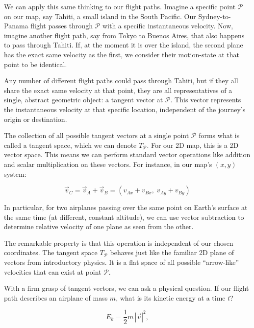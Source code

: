 \documentclass[twocolumn]{article}
\begin{document}
We can apply this same thinking to our flight paths. Imagine a specific
point \(\mathcal{P}\) on our map, say Tahiti, a small island in the South Pacific.
Our Sydney-to-Panama flight passes through \(\mathcal{P}\) with a specific
instantaneous velocity. Now, imagine another flight path, say from Tokyo
to Buenos Aires, that also happens to pass through Tahiti. If, at the
moment it is over the island, the second plane has the exact same
velocity as the first, we consider their motion-state at that point to be
identical.

Any number of different flight paths could pass through Tahiti,
but if they all share the exact same velocity at that point, they are
all representatives of a single, abstract geometric object: a tangent
vector at \(\mathcal{P}\). This vector represents the instantaneous velocity at
that specific location, independent of the journey's origin or
destination.

The collection of all possible tangent vectors at a single point \(\mathcal{P}\)
forms what is called a tangent space, which we can denote \(T_\mathcal{P}\). For
our 2D map, this is a 2D vector space. This means we can perform
standard vector operations like addition and scalar multiplication on
these vectors. For instance, in our map's \((x, y)\) system:

\begin{equation}
\vec{v}_C = \vec{v}_A + \vec{v}_B = (v_{Ax} + v_{Bx},\; v_{Ay} + v_{By})
\end{equation}

In particular, for two airplanes passing over the same point on
Earth's surface at the same time (at different, constant altitude), we
can use vector subtraction to determine relative velocity of one plane
as seen from the other.

The remarkable property is that this operation is independent of our
chosen coordinates. The tangent space \(T_\mathcal{P}\) behaves just like the
familiar 2D plane of vectors from introductory physics. It is a flat
space of all possible ``arrow-like'' velocities that can exist at
point \(\mathcal{P}\).

With a firm grasp of tangent vectors, we can ask a physical question. If
our flight path describes an airplane of mass \(m\), what is its kinetic
energy at a time \(t\)?

\begin{equation}
E_k = \frac{1}{2} m \, |\vec{v}|^2,
\end{equation}
\end{document}
